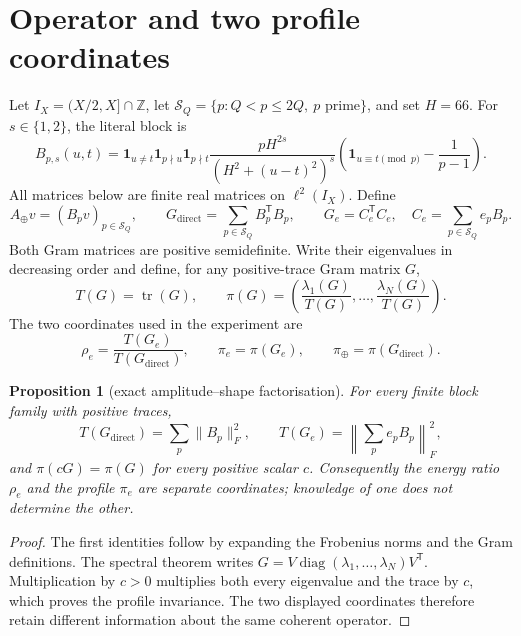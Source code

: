 \documentclass[10pt]{article}
\newtheorem{proposition}{Proposition}
\newcommand{\tr}{\operatorname{tr}}
\newcommand{\direct}{G_{\mathrm{direct}}}
\newcommand{\signed}{G_e}
\begin{document}
\section{Operator and two profile coordinates}

Let \(I_X=(X/2,X]\cap\mathbb Z\), let
\(\mathcal S_Q=\{p:Q<p\leq 2Q,\ p\text{ prime}\}\), and set \(H=66\).
For \(s\in\{1,2\}\), the literal block is
\begin{equation}
 B_{p,s}(u,t)=\mathbf 1_{u\ne t}\mathbf 1_{p\nmid u}\mathbf 1_{p\nmid t}
 \frac{pH^{2s}}{(H^2+(u-t)^2)^s}
 \left(\mathbf 1_{u\equiv t\pmod p}-\frac1{p-1}\right).
 \label{eq:block}
\end{equation}
All matrices below are finite real matrices on \(\ell^2(I_X)\).  Define
\begin{equation}
 A_{\oplus}v=(B_pv)_{p\in\mathcal S_Q},\qquad
 \direct=\sum_{p\in\mathcal S_Q}B_p^{\mathsf T}B_p,\qquad
 \signed=C_e^{\mathsf T}C_e,
 \quad C_e=\sum_{p\in\mathcal S_Q}e_pB_p.
 \label{eq:grams}
\end{equation}
Both Gram matrices are positive semidefinite.  Write their eigenvalues in
decreasing order and define, for any positive-trace Gram matrix \(G\),
\begin{equation}
 T(G)=\tr(G),\qquad
 \pi(G)=\left(\frac{\lambda_1(G)}{T(G)},\ldots,
                  \frac{\lambda_N(G)}{T(G)}\right).
 \label{eq:profile}
\end{equation}
The two coordinates used in the experiment are
\begin{equation}
 \rho_e=\frac{T(\signed)}{T(\direct)},
 \qquad \pi_e=\pi(\signed),
 \qquad \pi_\oplus=\pi(\direct).
 \label{eq:coordinates}
\end{equation}

\begin{proposition}[exact amplitude--shape factorisation]
For every finite block family with positive traces,
\[
 T(\direct)=\sum_p\|B_p\|_F^2,\qquad
 T(\signed)=\left\|\sum_pe_pB_p\right\|_F^2,
\]
and \(\pi(cG)=\pi(G)\) for every positive scalar \(c\).  Consequently the
energy ratio \(\rho_e\) and the profile \(\pi_e\) are separate coordinates;
knowledge of one does not determine the other.
\end{proposition}
\begin{proof}
The first identities follow by expanding the Frobenius norms and the Gram
definitions.  The spectral theorem writes
\(G=V\operatorname{diag}(\lambda_1,\ldots,\lambda_N)V^{\mathsf T}\).
Multiplication by \(c>0\) multiplies both every eigenvalue and the trace by
\(c\), which proves the profile invariance.  The two displayed coordinates
therefore retain different information about the same coherent operator.
\end{proof}
\end{document}

